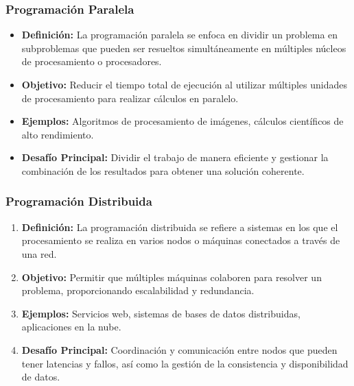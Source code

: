 \documentclass{beamer}
\begin{document}
\begin{frame}
  \frametitle{Programación Paralela}
  \begin{alertblock}
      

  \begin{itemize}
    \item \textbf{Definición:} La programación paralela se enfoca en dividir un problema en subproblemas que pueden ser resueltos simultáneamente en múltiples núcleos de procesamiento o procesadores.\pause
    \item \textbf{Objetivo:} Reducir el tiempo total de ejecución al utilizar múltiples unidades de procesamiento para realizar cálculos en paralelo.\pause
    \item \textbf{Ejemplos:} Algoritmos de procesamiento de imágenes, cálculos científicos de alto rendimiento.
    \item \textbf{Desafío Principal:} Dividir el trabajo de manera eficiente y gestionar la combinación de los resultados para obtener una solución coherente.
  \end{itemize}
  \end{alertblock}
\end{frame}

\begin{frame}
\begin{alertblock}
    

  \frametitle{Programación Distribuida}
  \begin{enumerate}
      
    \item \textbf{Definición:} La programación distribuida se refiere a sistemas en los que el procesamiento se realiza en varios nodos o máquinas conectados a través de una red.\pause
    \item \textbf{Objetivo:} Permitir que múltiples máquinas colaboren para resolver un problema, proporcionando escalabilidad y redundancia.\pause
    \item \textbf{Ejemplos:} Servicios web, sistemas de bases de datos distribuidas, aplicaciones en la nube.\pause
    \item \textbf{Desafío Principal:} Coordinación y comunicación entre nodos que pueden tener latencias y fallos, así como la gestión de la consistencia y disponibilidad de datos.
  \end{enumerate}
  \end{alertblock}
\end{frame}
\end{document}
